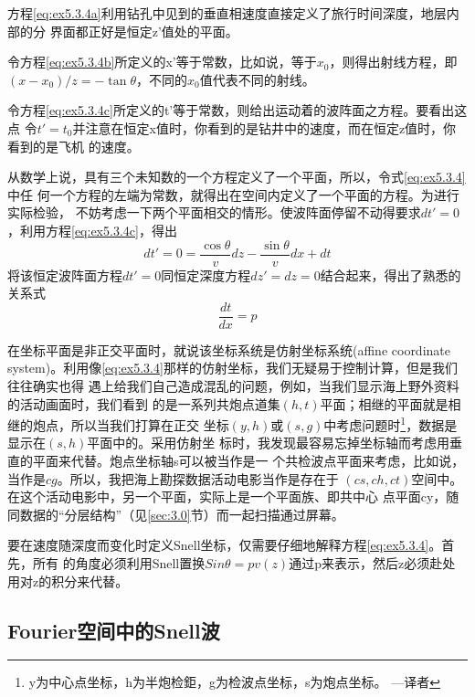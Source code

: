 方程\ref{eq:ex5.3.4a}利用钻孔中见到的垂直相速度直接定义了旅行时间深度，地层内部的分
界面都正好是恒定z'值处的平面。

令方程\ref{eq:ex5.3.4b}所定义的x'等于常数，比如说，等于$x_0$，则得出射线方程，即
$(x-x_0)/z=-\tan\theta$，不同的$x_0$值代表不同的射线。

令方程\ref{eq:ex5.3.4c}所定义的t'等于常数，则给出运动着的波阵面之方程。要看出这点
令$t'=t_0$并注意在恒定x值时，你看到的是钻井中的速度，而在恒定z值时，你看到的是飞机
的速度。

从数学上说，具有三个未知数的一个方程定义了一个平面，所以，令式\ref{eq:ex5.3.4}中任
何一个方程的左端为常数，就得出在空间内定义了一个平面的方程。为进行实际检验，
不妨考虑一下两个平面相交的情形。使波阵面停留不动得要求$dt'=0$，利用方程\ref{eq:ex5.3.4c}，得出
\begin{equation}
dt'=0=\frac{\cos\theta}{v}dz-\frac{\sin\theta}{v}dx+dt
\label{eq:ex5.3.5}
\end{equation}
将该恒定波阵面方程$dt'=0$同恒定深度方程$dz'=dz=0$结合起来，得出了熟悉的关系式
\begin{equation}
\frac{dt}{dx}=p
\label{eq:ex5.3.6}
\end{equation}

在坐标平面是非正交平面时，就说该坐标系统是仿射坐标系统(affine coordinate
system)。利用像\ref{eq:ex5.3.4}那样的仿射坐标，我们无疑易于控制计算，但是我们往往确实也得
遇上给我们自己造成混乱的问题，例如，当我们显示海上野外资料的活动画面时，我们看到
的是一系列共炮点道集$(h,t)$平面；相继的平面就是相继的炮点，所以当我们打算在正交
坐标$(y,h)$或$(s,g)$中考虑问题时\footnote{
y为中心点坐标，h为半炮检鉅，g为检波点坐标，s为炮点坐标。 ---译者
}，数据是显示在$(s,h)$平面中的。采用仿射坐
标时，我发现最容易忘掉坐标轴而考虑用垂直的平面来代替。炮点坐标轴s可以被当作是一
个共检波点平面来考虑，比如说，当作是$cg$。所以，我把海上勘探数据活动电影当作是存在于
$(cs,ch,ct)$空间中。在这个活动电影中，另一个平面，实际上是一个平面族、即共中心
点平面cy，随同数据的“分层结构”（见\ref{sec:3.0}节）而一起扫描通过屏幕。

要在速度随深度而变化时定义Snell坐标，仅需要仔细地解释方程\ref{eq:ex5.3.4}。首先，所有
的角度必须利用Snell置换$Sin\theta=pv(z)$通过p来表示，然后z必须赴处用对z的积分来代替。


\subsection{Fourier空间中的Snell波}
\label{sec:5.3.7}

